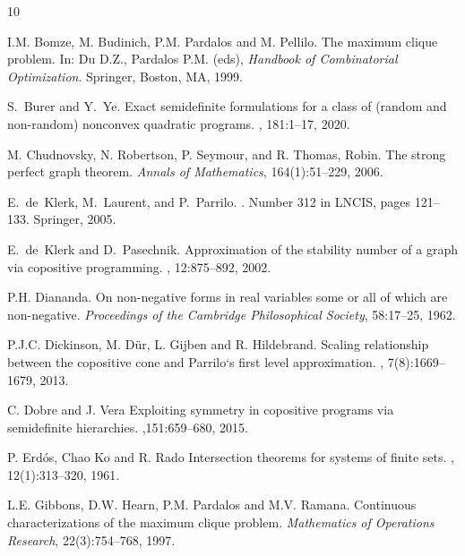 \documentclass[11pt]{article}
\numberwithin{equation}{section}
\begin{document}
\begin{thebibliography}{10}

I.M. Bomze, M. Budinich, P.M. Pardalos and M. Pellilo.
The maximum clique problem.
 In: Du D.Z., Pardalos P.M. (eds), {\em Handbook of Combinatorial Optimization}. Springer, Boston, MA, 1999.



S.~Burer and Y.~Ye.
\newblock Exact semidefinite formulations for a class of (random and
  non-random) nonconvex quadratic programs.
, 181:1--17, 2020.


M. Chudnovsky, N. Robertson, P. Seymour, and R. Thomas, Robin.
The strong perfect graph theorem.
{\em Annals of Mathematics}, 164(1):51--229,
2006.

E.~de~Klerk, M.~Laurent, and P.~Parrilo.
.
\newblock Number 312 in LNCIS, pages 121--133. Springer, 2005.

E.~de~Klerk and D.~Pasechnik.
\newblock Approximation of the stability number of a graph via copositive
  programming.
, 12:875--892,  2002.

P.H. Diananda. On non-negative forms in real variables some or all of which are non-negative.
{\em Proceedings of the Cambridge Philosophical Society}, 58:17--25, 1962.

P.J.C. Dickinson, M. D\"ur, L. Gijben and R. Hildebrand.
\newblock Scaling relationship between the copositive cone and Parrilo`s first level approximation.
, 7(8):1669--1679, 2013.

C. Dobre and J. Vera
\newblock Exploiting symmetry in copositive programs via semidefinite hierarchies.
,151:659--680, 2015.


P. Erd\'os, Chao Ko and R. Rado
\newblock Intersection theorems for systems of finite sets.
, 12(1):313--320, 1961.


L.E. Gibbons, D.W. Hearn, P.M. Pardalos and M.V. Ramana.
Continuous characterizations of the maximum clique problem.
{\em Mathematics of Operations Research}, 22(3):754--768, 1997.


\end{thebibliography}
\end{document}
